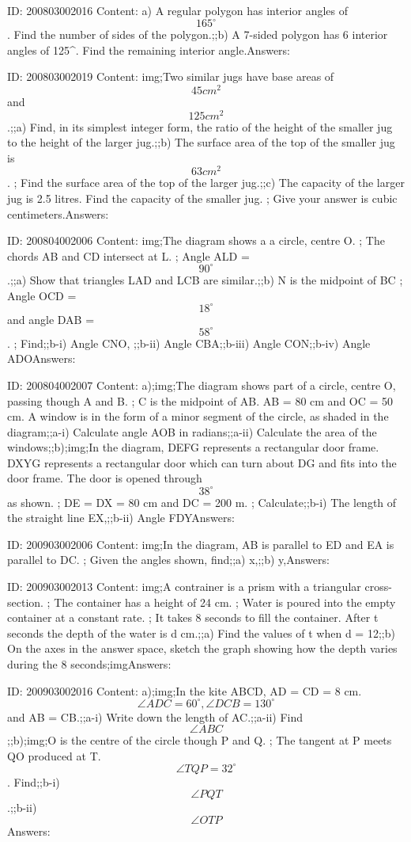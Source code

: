 \documentclass{article}
\begin{document}
ID: 200803002016
Content:
a) A regular polygon has interior angles of $$165^{\circ}$$. Find the number of sides of the polygon.;;b) A 7-sided polygon has 6 interior angles of 125^{\circ}. Find the remaining interior angle.Answers:

ID: 200803002019
Content:
img;Two similar jugs have base areas of $$45 cm^2$$ and $$125 cm^2$$.;;a) Find, in its simplest integer form, the ratio of the height of the smaller jug to the height of the larger jug.;;b) The surface area of the top of the smaller jug is $$63 cm^2$$. ; Find the surface area of the top of the larger jug.;;c) The capacity of the larger jug is 2.5 litres. Find the capacity of the smaller jug. ; Give your answer is cubic centimeters.Answers:

ID: 200804002006
Content:
img;The diagram shows a a circle, centre O. ; The chords AB and CD intersect at L. ; Angle ALD = $$90^{\circ}$$.;;a) Show that triangles LAD and LCB are similar.;;b) N is the midpoint of BC ; Angle OCD = $$18^{\circ}$$ and angle DAB = $$58^{\circ}$$. ; Find;;b-i) Angle CNO, ;;b-ii) Angle CBA;;b-iii) Angle CON;;b-iv) Angle ADOAnswers:

ID: 200804002007
Content:
a);img;The diagram shows part of a circle, centre O, passing though A and B. ; C is the midpoint of AB. AB = 80 cm and OC = 50 cm. A window is in the form of a minor segment of the circle, as shaded in the diagram;;a-i) Calculate angle AOB in radians;;a-ii) Calculate the area of the windows;;b);img;In the diagram, DEFG represents a rectangular door frame. DXYG represents a rectangular door which can turn about DG and fits into the door frame. The door is opened through $$38^{\circ}$$ as shown. ; DE = DX = 80 cm and DC = 200 m. ; Calculate;;b-i) The length of the straight line EX,;;b-ii) Angle FDYAnswers:

ID: 200903002006
Content:
img;In the diagram, AB is parallel to ED and EA is parallel to DC. ; Given the angles shown, find;;a) x,;;b) y,Answers:

ID: 200903002013
Content:
img;A contrainer is a prism with a triangular cross-section. ; The container has a height of 24 cm. ; Water is poured into the empty container at a constant rate. ; It takes 8 seconds to fill the container. After t seconds the depth of the water is d cm.;;a) Find the values of t when d = 12;;b) On the axes in the answer space, sketch the graph showing how the depth varies during the 8 seconds;imgAnswers:

ID: 200903002016
Content:
a);img;In the kite ABCD, AD = CD = 8 cm. $$\angle ADC = 60^{\circ}, \angle DCB = 130^{\circ}$$ and AB = CB.;;a-i) Write down the length of AC.;;a-ii) Find $$\angle ABC$$;;b);img;O is the centre of the circle though P and Q. ; The tangent at P meets QO produced at T. $$\angle TQP = 32^{\circ}$$. Find;;b-i) $$\angle PQT$$.;;b-ii) $$\angle OTP$$Answers:
\end{document}

